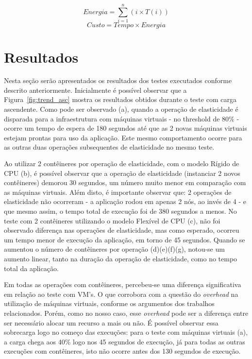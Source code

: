 \documentclass[twoside,english,brazilian]{UNISINOSartigo}
\begin{document}
\begin{equation}
\label{eq:1}
Energia = \sum_{i=1}^{n}{(i \times T(i))}
\end{equation}
\begin{equation}
\label{eq:2}
Custo = Tempo \times Energia
\end{equation}

\section{Resultados}
\label{avaliacao}
Nesta seção serão apresentados os resultados dos testes executados conforme descrito anteriormente. Inicialmente é possível observar que a Figura~\ref{fig:trend_asc} mostra os resultados obtidos durante o teste com carga ascendente. Como pode ser observado (a), quando a operação de elasticidade é disparada para a infraestrutura com máquinas virtuais - no threshold de 80\% - ocorre um tempo de espera de 180 segundos até que as 2 novas máquinas virtuais estejam prontas para uso da aplicação. Este mesmo comportamento ocorre para as outras duas operações subsequentes de elasticidade no mesmo teste.

Ao utilizar 2 contêineres por operação de elasticidade, com o modelo Rígido de CPU (b), é possível observar que a operação de elasticidade (instanciar 2 novos contêineres) demorou 30 segundos, um número muito menor em comparação com as máquinas virtuais. Além disto, é importante observar que: 2 operações de elasticidade não ocorreram - a aplicação rodou em apenas 2 nós, ao invés de 4 - e que mesmo assim, o tempo total de execução foi de 380 segundos a menos. No teste com 2 contêineres utilizando o modelo Flexível de CPU (c), não foi observado diferença nas operações de elasticidade, mas como esperado, ocorreu um tempo menor de execução da aplicação, em torno de 45 segundos. Quando se aumentou o número de contêineres por operação (d)(e)(f)(g), notou-se um aumento linear, tanto na duração da operação de elasticidade, como no tempo total da aplicação. 

Em todas as operações com contêineres, percebeu-se uma diferença significativa em relação ao teste com VM's. O que corrobora com a questão do \textit{overhead} na utilização de máquinas virtuais, conforme os argumentos dos trabalhos relacionados. Porém, como no nosso caso, esse \textit{overhead} pode ser a diferença entre ser necessário alocar um recurso a mais ou não. É possível observar essa sobrecarga logo no começo das execuções: para o teste com máquinas virtuais (a), a carga chega aos 40\% logo nos 45 segundos de execução, já para todas as outras execuções com contêineres, isto não ocorre antes dos 130 segundos de execução.
\end{document}
